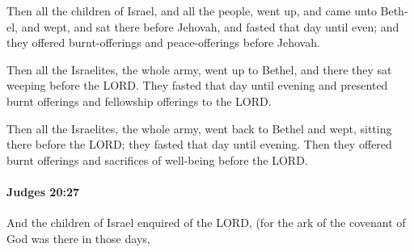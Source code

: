 			\begin{versebox}
					\item[BHS] 
					\item[ASV] Then all the children of Israel, and all the people, went up, and came unto Beth-el, and wept, and sat there before Jehovah, and fasted that day until even; and they offered burnt-offerings and peace-offerings before Jehovah.
					\item[NIV] Then all the Israelites, the whole army, went up to Bethel, and there they sat weeping before the LORD. They fasted that day until evening and presented burnt offerings and fellowship offerings to the LORD.
					\item[NRSV] Then all the Israelites, the whole army, went back to Bethel and wept, sitting there before the LORD; they fasted that day until evening. Then they offered burnt offerings and sacrifices of well-being before the LORD.
			\end{versebox}

		\paragraph{Judges 20:27} %
			\label{JUDGES-20-27}

			And the children of Israel enquired of the LORD, (for the ark of the covenant of God was there in those days,

